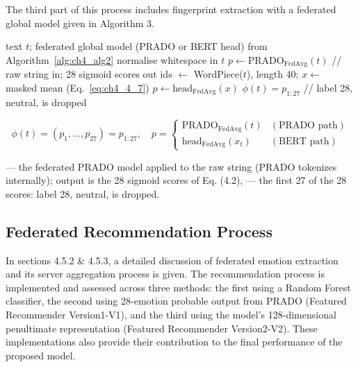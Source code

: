 The third part of this process includes fingerprint extraction with a federated global model given in Algorithm 3.

\begin{algorithm}[htbp]
\caption{Fingerprint extraction with a federated global model. The emotion fingerprint is a fixed-length vector containing the predicted probabilities of all emotion classes (excluding the neutral class). It is a compact emotional representation of a text and is used for subsequent recommendation and similarity computations.}
\label{alg:ch4_alg3}
\begin{algorithmic}[1]
\Require text $t$; federated global model (PRADO or BERT head) from Algorithm~\ref{alg:ch4_alg2}
\State normalise whitespace in $t$
\State $p \leftarrow \text{PRADO}_{\text{FedAvg}}(t)$ \hfill // raw string in; 28 sigmoid scores out
\Else
\State ids $\leftarrow$ WordPiece($t$), length 40; $x \leftarrow$ masked mean (Eq.~\ref{eq:ch4_4_7})
\State $p \leftarrow \text{head}_{\text{FedAvg}}(x)$
\EndIf
\Return $\phi(t) = p_{1:27}$ \hfill // label 28, neutral, is dropped
\end{algorithmic}
\end{algorithm}

\begin{equation}
  \phi(t) = (p_{1}, \ldots, p_{27}) = p_{1:27}, \quad p = \begin{cases} \text{PRADO}_{\text{FedAvg}}(t) & (\text{PRADO path}) \\ \text{head}_{\text{FedAvg}}(x_{t}) & (\text{BERT path}) \end{cases}
  \label{eq:ch4_4_9}
\end{equation}

--- the federated PRADO model applied to the raw string  (PRADO tokenizes internally); output is the 28 sigmoid scores of Eq. (4.2),  --- the first 27 of the 28 scores: label 28, neutral, is dropped.

\subsection{Federated Recommendation Process}
In sections 4.5.2 \& 4.5.3, a detailed discussion of federated emotion extraction and its server aggregation process is given. The recommendation process is implemented and assessed across three methods: the first using a Random Forest classifier, the second using 28-emotion probable output from PRADO (Featured Recommender Version1-V1), and the third using the model’s 128-dimensional penultimate representation (Featured Recommender Version2-V2). These implementations also provide their contribution to the final performance of the proposed model.

